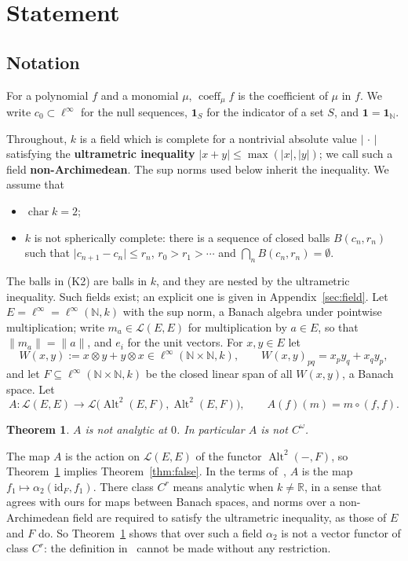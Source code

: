 \documentclass[11pt]{amsart}
\newtheorem{theorem}{Theorem}
\theoremstyle{remark}
\newcommand{\kk}{k}
\newcommand{\linf}{\ell^\infty}
\newcommand{\N}{\mathbb{N}}
\newcommand{\cL}{\mathcal{L}}
\newcommand{\Alt}{\operatorname{Alt}}
\newcommand{\coeff}{\operatorname{coeff}}
\newcommand{\abs}[1]{\lvert #1\rvert}
\newcommand{\norm}[1]{\lVert #1\rVert}
\newcommand{\1}{\mathbf{1}}
\begin{document}
\section{Statement}\label{sec:statement}
\subsection*{Notation}
For a polynomial $f$ and a monomial $\mu$, $\coeff_\mu f$ is the coefficient of
$\mu$ in $f$. We write $c_0\subset\linf$ for the null sequences, $\1_S$ for the indicator of a set $S$, and $\1=\1_\N$.

Throughout, $\kk$ is a field which is complete for a nontrivial absolute value $\abs{\,\cdot\,}$ satisfying the
\textbf{ultrametric inequality} $\abs{x+y}\le\max(\abs x,\abs y)$; we call such a field \textbf{non-Archimedean}. The sup norms used below inherit the inequality. We assume that
\begin{itemize}
\item[(K1)] $\operatorname{char}\kk=2$;
\item[(K2)] $\kk$ is not spherically complete: there is a sequence of closed balls $B(c_n,r_n)$ such that
$\abs{c_{n+1}-c_n}\le r_n$, $r_0>r_1>\cdots$ and $\bigcap_n B(c_n,r_n)=\emptyset$.
\end{itemize}
The balls in (K2) are balls in $\kk$, and they are nested by the ultrametric inequality. Such fields exist; an explicit one is given in
Appendix~\ref{sec:field}. Let $E=\linf=\linf(\N,\kk)$ with the sup norm, a Banach
algebra under pointwise multiplication; write $m_a\in\cL(E,E)$ for multiplication by $a\in E$, so that
$\norm{m_a}=\norm a$, and $e_i$ for the unit vectors. For $x,y\in E$ let
\[
W(x,y):=x\otimes y+y\otimes x\in\linf(\N\times\N,\kk),\qquad W(x,y)_{pq}=x_py_q+x_qy_p ,
\]
and let $F\subseteq\linf(\N\times\N,\kk)$ be the closed linear span of all $W(x,y)$, a Banach space. Let
\[
A\colon \cL(E,E)\to\cL\bigl(\Alt^2(E,F),\Alt^2(E,F)\bigr),\qquad A(f)(m)=m\circ(f,f).
\]

\begin{theorem}\label{thm:main}
$A$ is not analytic at $0$. In particular $A$ is not $C^\omega$.
\end{theorem}

The map $A$ is the action on $\cL(E,E)$ of the functor $\Alt^2(-,F)$, so Theorem~\ref{thm:main} implies
Theorem~\ref{thm:false}. In the terms of~\cite{Bou}, $A$ is the map $f_1\mapsto\alpha_2(\mathrm{id}_F,f_1)$. There class $C^r$ means
analytic when $\kk\ne\mathbb R$, in a sense that agrees with ours for maps between Banach spaces, and norms over a non-Archimedean
field are required to satisfy the ultrametric inequality, as those of $E$ and $F$ do. So Theorem~\ref{thm:main} shows that over such a
field $\alpha_2$ is not a vector functor of class $C^r$: the definition in~\cite[n\textsuperscript{o}~7.8.1]{Bou} cannot be made
without any restriction.
\end{document}
